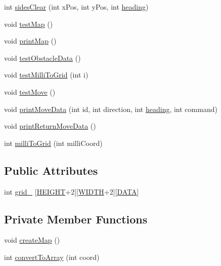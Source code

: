 \begin{DoxyCompactItemize}
int \mbox{\hyperlink{class_navigator_a1d670758a59db4df8ea64110ae2979d1}{sides\+Clear}} (int x\+Pos, int y\+Pos, int \mbox{\hyperlink{bot_main_8ino_aa0a9c2882aad6535e52a6d429f1d42da}{heading}})
\item 
void \mbox{\hyperlink{class_navigator_afe98283ec2d1bf0125c63eb077cc1d61}{test\+Map}} ()
\item 
void \mbox{\hyperlink{class_navigator_a2565ae0fea67cfec45a553ef0d7e06a4}{print\+Map}} ()
\item 
void \mbox{\hyperlink{class_navigator_ae31be1ae0d17e7fc78aa7c6a4553fca2}{test\+Obstacle\+Data}} ()
\item 
void \mbox{\hyperlink{class_navigator_ad24af0142a398b88f193941fcc776ddc}{test\+Milli\+To\+Grid}} (int i)
\item 
void \mbox{\hyperlink{class_navigator_a8df511cb7ce67515d86201f017525be4}{test\+Move}} ()
\item 
void \mbox{\hyperlink{class_navigator_a256336446ba7204c4b56cbfea2b9004f}{print\+Move\+Data}} (int id, int direction, int \mbox{\hyperlink{bot_main_8ino_aa0a9c2882aad6535e52a6d429f1d42da}{heading}}, int command)
\item 
void \mbox{\hyperlink{class_navigator_a2f5716e193c26854f0216cb7348fbfd5}{print\+Return\+Move\+Data}} ()
\item 
int \mbox{\hyperlink{class_navigator_a2e9d96fbec09518d6ef692457381213f}{milli\+To\+Grid}} (int milli\+Coord)
\end{DoxyCompactItemize}
\subsection*{Public Attributes}
\begin{DoxyCompactItemize}
\item 
int \mbox{\hyperlink{class_navigator_ad295138915accad1b15031a977f59b3e}{grid\+\_\+}} \mbox{[}\mbox{\hyperlink{_navigator_8h_af728b7647e0b8c49832983a31f9a2e9b}{H\+E\+I\+G\+HT}}+2\mbox{]}\mbox{[}\mbox{\hyperlink{_navigator_8h_a9649ab8139c4c2ea5c93625b30d92a05}{W\+I\+D\+TH}}+2\mbox{]}\mbox{[}\mbox{\hyperlink{_navigator_8h_ace45c8c944a852d4990f5f8f87b2335e}{D\+A\+TA}}\mbox{]}
\end{DoxyCompactItemize}
\subsection*{Private Member Functions}
\begin{DoxyCompactItemize}
\item 
void \mbox{\hyperlink{class_navigator_a8b0cb171e3e3b16b206278fb23f624bc}{create\+Map}} ()
\item 
int \mbox{\hyperlink{class_navigator_a7a745d33cfa5cdfc551c87f3f23dc28e}{convert\+To\+Array}} (int coord)
\end{DoxyCompactItemize}


